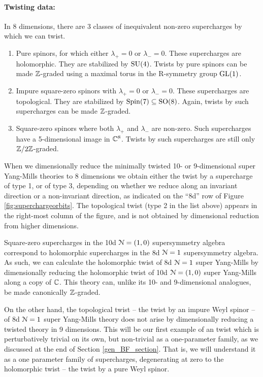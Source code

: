 \documentclass[10pt, oneside]{article}
\begin{document}
\vspace{-10pt}
\paragraph{Twisting data:}
In 8 dimensions, there are 3 classes of inequivalent non-zero supercharges by which we can twist.
\begin{enumerate}
 \item Pure spinors, for which either $\lambda_+ = 0$ or $\lambda_- = 0$.  These supercharges are holomorphic.  They are stabilized by $\mathrm{SU}(4)$.  Twists by pure spinors can be made $\mathbb Z$-graded using a maximal torus in the R-symmetry group $\mathrm{GL}(1)$.
 \item Impure square-zero spinors with $\lambda_+ = 0$ or $\lambda_- = 0$.  These supercharges are topological.  They are stabilized by $\mathrm{Spin}(7) \subseteq \mathrm{SO}(8)$.  Again, twists by such supercharges can be made $\mathbb Z$-graded.
 \item Square-zero spinors where both $\lambda_+$ and $\lambda_-$ are non-zero.  Such supercharges have a 5-dimensional image in $\mathbb C^8$.  Twists by such supercharges are still only $\mathbb Z/2\mathbb Z$-graded.
\end{enumerate}

When we dimensionally reduce the minimally twisted 10- or 9-dimensional super Yang-Mills theories to 8 dimensions we obtain either the twist by a supercharge of type 1, or of type 3, depending on whether we reduce along an invariant direction or a non-invariant direction, as indicated on the ``8d'' row of Figure \ref{fig:superchargeorbits}.  The topological twist (type 2 in the list above) appears in the right-most column of the figure, and is not obtained by dimensional reduction from higher dimensions.

Square-zero supercharges in the 10d $\mathcal{N}=(1,0)$ supersymmetry algebra correspond to holomorphic supercharges in the 8d $\mathcal{N}=1$ supersymmetry algebra.  As such, we can calculate the holomorphic twist of 8d $\mathcal{N}=1$ super Yang-Mills by dimensionally reducing the holomorphic twist of 10d $\mathcal{N}=(1,0)$ super Yang-Mills along a copy of $\mathbb C$.  This theory can, unlike its 10- and 9-dimensional analogues, be made canonically $\mathbb Z$-graded.

On the other hand, the topological twist -- the twist by an impure Weyl spinor -- of 8d $\mathcal{N}=1$ super Yang-Mills theory does not arise by dimensionally reducing a twisted theory in 9 dimensions.  This will be our first example of an twist which is perturbatively trivial on its own, but non-trivial as a one-parameter family, as we discussed at the end of Section \ref{gen_BF_section}.  That is, we will understand it as a one parameter family of supercharges, degenerating at zero to the holomorphic twist -- the twist by a pure Weyl spinor.
\end{document}
